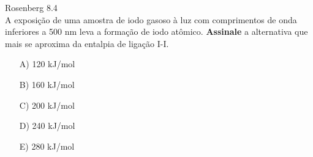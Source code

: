 \begin{problem}[answer = D]
    
    Rosenberg 8.4\\
    A exposição de uma amostra de iodo gasoso à luz com comprimentos de onda inferiores a 500 nm leva a formação de iodo atômico. 
    \textbf{Assinale} a alternativa que mais se aproxima da entalpia de ligação I-I.
    \begin{itemize}
        \item [A)] 120 kJ/mol
        \item [B)] 160 kJ/mol
        \item [C)] 200 kJ/mol
        \item [D)] 240 kJ/mol
        \item [E)] 280 kJ/mol
    \end{itemize}

\end{problem}